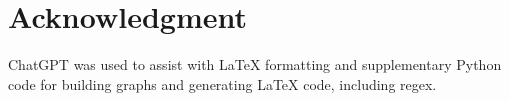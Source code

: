 \documentclass[conference]{IEEEtran}
\begin{document}
\section*{Acknowledgment}

ChatGPT was used to assist with \LaTeX{} formatting and supplementary Python
code for building graphs and generating \LaTeX{} code, including regex.

\newpage



\end{document}
